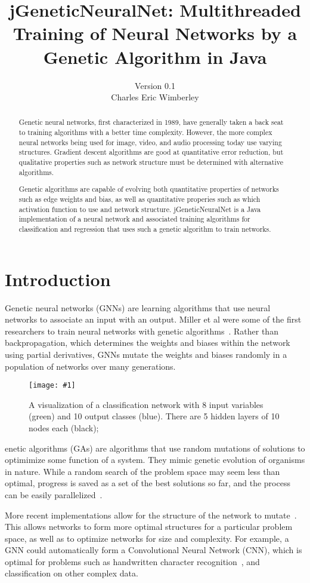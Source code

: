 \documentclass[twocolumn]{article}
\title{jGeneticNeuralNet: Multithreaded Training of Neural Networks by a Genetic Algorithm in Java}
\author{Version 0.1 \\ Charles Eric Wimberley}
\newcommand\fig[5]{
	\begin{figure}[H]
		\begin{center}\texttt{[image: \#1]}\end{center}
		\caption{#4}\label{fig:#2}
	\end{figure}
}
\begin{document}
\maketitle


\begin{abstract}
Genetic neural networks, first characterized in 1989, have generally taken a back seat to training algorithms with a better time complexity. However, the more complex neural networks being used for image, video, and audio processing today use varying structures. Gradient descent algorithms are good at quantitative error reduction, but qualitative properties such as network structure must be determined with alternative algorithms.

Genetic algorithms are capable of evolving both quantitative properties of networks such as edge weights and bias, as well as quantitative properies such as which activation function to use and network structure. jGeneticNeuralNet is a Java implementation of a neural network and associated training algorithms for classification and regression that uses such a genetic algorithm to train networks.
\end{abstract}

\section{Introduction}
Genetic neural networks (GNNs) are learning algorithms that use neural networks to associate an input with an output. Miller et al were some of the first researchers to train neural networks with genetic algorithms~\cite{MillerToddHedge}. Rather than backpropagation, which determines the weights and biases within the network using partial derivatives, GNNs mutate the weights and biases randomly in a population of networks over many generations. 

\fig{images/visualization.png}{networkVis}{0.18}{
A visualization of a classification network with 8 input variables (green) and 10 output classes (blue). There are 5 hidden layers of 10 nodes each (black);
}

Genetic algorithms (GAs) are algorithms that use random mutations of solutions to optimimize some function of a system. They mimic genetic evolution of organisms in nature. While a random search of the problem space may seem less than optimal, progress is saved as a set of the best solutions so far, and the process can be easily parallelized~\cite{Tanese:1989:DGA:915973}.

More recent implementations allow for the structure of the network to mutate~\cite{LamStructure}. This allows networks to form more optimal structures for a particular problem space, as well as to optimize networks for size and complexity. For example, a GNN could automatically form a Convolutional Neural Network (CNN), which is optimal for problems such as handwritten character recognition~\cite{ConvolutionalCharacterClassification}, and classification on other complex data. 
\end{document}
